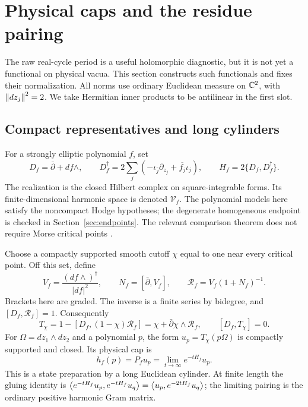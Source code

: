 \section{Physical caps and the residue pairing}
\label{sec:caps}
The raw real-cycle period is a useful holomorphic diagnostic, but it is
not yet a functional on physical vacua. This section constructs such
functionals and fixes their normalization. All norms use ordinary
Euclidean measure on $\mathbb C^2$, with $\left\lVert dz_j\right\rVert^2=2$. We take Hermitian
inner products to be antilinear in the first slot.

\subsection{Compact representatives and long cylinders}
For a strongly elliptic polynomial $f$, set
\[
D_f=\bar\partial+df\wedge,\qquad
D_f^\dagger=2\sum_j
 \left(-\iota_{\bar j}\partial_{z_j}+\overline{f_j}\iota_j\right),
\qquad H_f=2\{D_f,D_f^\dagger\}.
\]
The realization is the closed Hilbert complex on square-integrable
forms. Its finite-dimensional harmonic space is denoted $\mathcal V_f$.
The polynomial models here satisfy the noncompact Hodge hypotheses;
the degenerate homogeneous endpoint is checked in
Section~\ref{sec:endpoints}. The relevant comparison theorem does not
require Morse critical points \cite{LiWen}.

Choose a compactly supported smooth cutoff $\chi$ equal to one near
every critical point. Off this set, define
\[
V_f=\frac{(df\wedge)^\dagger}{|df|^2},\qquad
N_f=[\bar\partial,V_f],\qquad
\mathcal R_f=V_f(1+N_f)^{-1}.
\]
Brackets here are graded. The inverse is a finite series by bidegree,
and $[D_f,\mathcal R_f]=1$. Consequently
\begin{equation}\label{caps:cutoff}
T_\chi=1-[D_f,(1-\chi)\mathcal R_f]
       =\chi+\bar\partial\chi\wedge\mathcal R_f,
\qquad [D_f,T_\chi]=0.
\end{equation}
For $\Omega=dz_1\wedge dz_2$ and a polynomial $p$, the form
$u_p=T_\chi(p\Omega)$ is compactly supported and closed. Its physical
cap is
\begin{equation}\label{caps:heat}
h_f(p)=P_fu_p=\lim_{t\to\infty}e^{-tH_f}u_p.
\end{equation}
This is a state preparation by a long Euclidean cylinder. At finite
length the gluing identity is
$\left\langle e^{-tH_f}u_p,e^{-tH_f}u_q\right\rangle
=\left\langle u_p,e^{-2tH_f}u_q\right\rangle$; the limiting pairing is the ordinary
positive harmonic Gram matrix.

